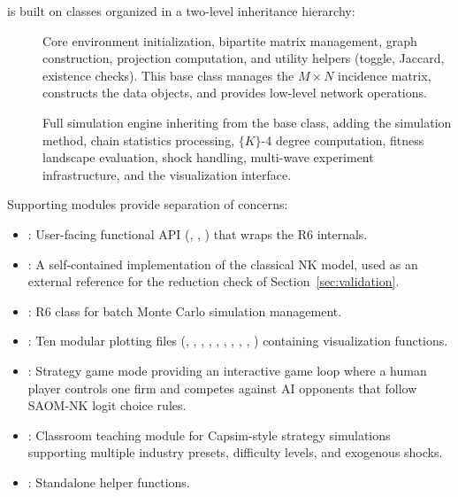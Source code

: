 \documentclass[
  article]{jss}
\begin{document}
 is built on  classes organized in a two-level
inheritance hierarchy:

\begin{description}
\item[] Core environment initialization,
  bipartite matrix management, graph construction, projection computation, and
  utility helpers (toggle, Jaccard, existence checks).  This base class
  manages the $M \times N$ incidence matrix, constructs the  data
  objects, and provides low-level network operations.

\item[] Full simulation engine inheriting from the
  base class, adding the  simulation method, chain
  statistics processing, $\{K\}$-4 degree computation, fitness landscape
  evaluation, shock handling, multi-wave experiment infrastructure, and the
  visualization interface.
\end{description}

Supporting modules provide separation of concerns:

\begin{itemize}
\item {}: User-facing functional API (,
  , ) that wraps the R6 internals.
\item {}: A self-contained implementation of the classical
  NK model, used as an external reference for the reduction check of
  Section~\ref{sec:validation}.
\item {}:  R6 class for batch
  Monte Carlo simulation management.
\item {}: Ten modular plotting files (,
  , , ,
  , , ,
  , , )
  containing visualization functions.
\item {}: Strategy game mode providing an interactive
  game loop where a human player controls one firm and competes against AI
  opponents that follow SAOM-NK logit choice rules.
\item {}: Classroom teaching module for Capsim-style
  strategy simulations supporting multiple industry presets, difficulty
  levels, and exogenous shocks.
\item {}: Standalone helper functions.
\end{itemize}
\end{document}
